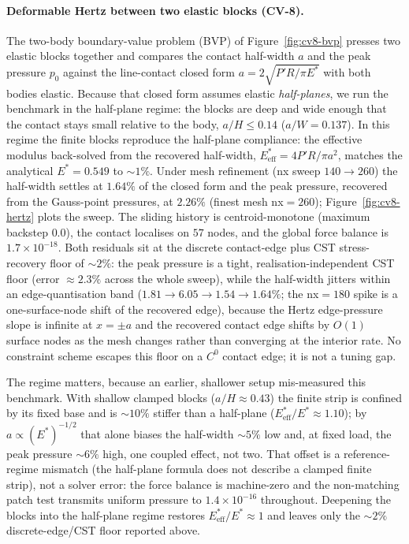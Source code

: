 \documentclass{svjour3}                 %
\begin{document}
\paragraph{Deformable Hertz between two elastic blocks (CV-8).} The two-body boundary-value problem (BVP) of Figure~\ref{fig:cv8-bvp}
presses two elastic blocks together and compares the contact half-width $a$ and the peak pressure $p_0$ against
the line-contact closed form $a=2\sqrt{P'R/\pi E^{*}}$ with both bodies elastic. Because that closed form assumes
elastic \emph{half-planes}, we run the benchmark in the half-plane regime: the blocks are deep and wide enough
that the contact stays small relative to the body, $a/H\le0.14$ ($a/W=0.137$). In this regime the finite blocks
reproduce the half-plane compliance: the effective modulus back-solved from the recovered half-width,
$E^{*}_{\mathrm{eff}}=4P'R/\pi a^{2}$, matches the analytical $E^{*}=0.549$ to $\sim1\%$. Under mesh refinement
(nx sweep $140\to260$) the half-width settles at $1.64\%$ of the closed form and the peak pressure, recovered
from the Gauss-point pressures, at $2.26\%$ (finest mesh nx$=260$); Figure~\ref{fig:cv8-hertz} plots the sweep.
The sliding history is centroid-monotone (maximum backstep $0.0$), the contact localises on $57$ nodes, and the
global force balance is $1.7\times10^{-18}$. Both residuals sit at the discrete contact-edge plus
CST stress-recovery floor of $\sim2\%$: the peak pressure is a tight,
realisation-independent CST floor (error $\approx2.3\%$ across the whole sweep), while the half-width jitters
within an edge-quantisation band ($1.81\to6.05\to1.54\to1.64\%$; the nx$=180$ spike is a one-surface-node shift
of the recovered edge), because the Hertz edge-pressure slope is infinite at $x=\pm a$ and the recovered contact
edge shifts by $O(1)$ surface nodes as the mesh changes rather than converging at the interior rate. No
constraint scheme escapes this floor on a $C^0$ contact edge; it is not a tuning gap.

The regime matters, because an earlier, shallower setup mis-measured this benchmark. With shallow
clamped blocks ($a/H\approx0.43$) the finite strip is confined by its fixed base and is $\sim10\%$ stiffer than a
half-plane ($E^{*}_{\mathrm{eff}}/E^{*}\approx1.10$); by $a\propto(E^{*})^{-1/2}$ that alone biases the
half-width $\sim5\%$ low and, at fixed load, the peak pressure $\sim6\%$ high, one coupled effect, not two. That
offset is a reference-regime mismatch (the half-plane formula does not describe a clamped finite strip), not a
solver error: the force balance is machine-zero and the non-matching patch test transmits uniform pressure to
$1.4\times10^{-16}$ throughout. Deepening the blocks into the half-plane regime restores
$E^{*}_{\mathrm{eff}}/E^{*}\approx1$ and leaves only the $\sim2\%$ discrete-edge/CST floor reported above.
\end{document}
